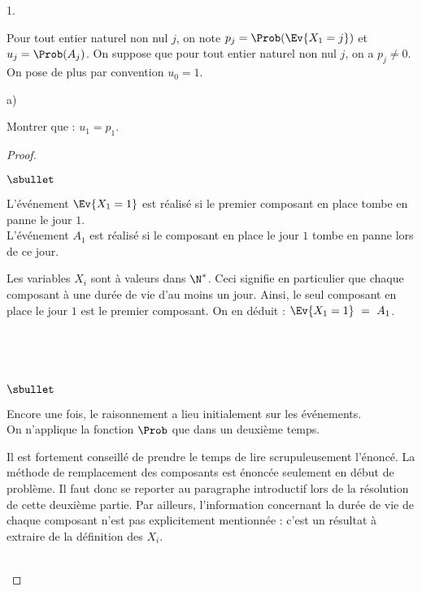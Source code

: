 \begin{noliste}{1.}
  \setlength{\itemsep}{2mm} \setcounter{enumi}{3}
\item Pour tout entier naturel non nul $j$, on note
  $p_j=\Prob(\Ev{X_1=j})$ et $u_j=\Prob(A_j)$. On suppose que pour
  tout entier naturel non nul $j$, on a $p_j \neq 0$. On pose de plus
  par convention $u_0=1$.
  \begin{noliste}{a)}
  \item Montrer que : $u_1 = p_1$.\\[-.8cm]

    \begin{proof}~%
      \begin{noliste}{$\sbullet$}
      \item L'événement $\Ev{X_1 = 1}$ est réalisé si le premier
        composant en place tombe en panne le jour $1$.\\
        L'événement $A_1$ est réalisé si le composant en place le jour
        $1$ tombe en panne lors de ce jour.

      \item Les variables $X_i$ sont à valeurs dans $\N^*$. Ceci
        signifie en particulier que chaque composant à une durée de
        vie d'au moins un jour. Ainsi, le seul composant en place le
        jour $1$ est le premier composant. On en déduit : $\Ev{X_1 =
          1} \ = \ A_1$.
      \end{noliste}
      ~\\[-1.4cm]
      \begin{remarkL}{.95}~\\[-.8cm]%
        \begin{noliste}{$\sbullet$}
        \item Encore une fois, le raisonnement a lieu initialement sur
          les événements.\\
          On n'applique la fonction $\Prob$ que dans un deuxième
          temps.
        \item Il est fortement conseillé de prendre le temps de lire
          scrupuleusement l'énoncé. La méthode de remplacement des
          composants est énoncée seulement en début de problème. Il
          faut donc se reporter au paragraphe introductif lors de la
          résolution de cette deuxième partie. Par ailleurs,
          l'information concernant la durée de vie de chaque composant
          n'est pas explicitement mentionnée : c'est un résultat à
          extraire de la définition des \var $X_i$.
        \end{noliste}
      \end{remarkL}~\\[-1.4cm]
    \end{proof}
    


\end{noliste}
\end{noliste}
